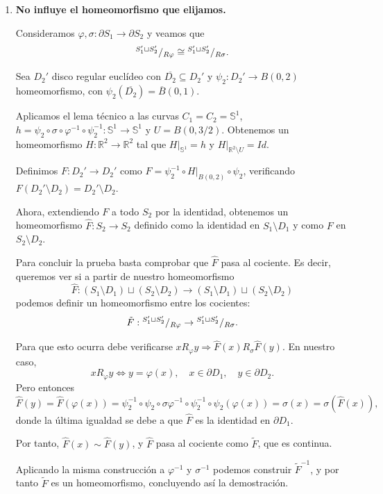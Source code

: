 {\begin{enumerate}
        Pero como $F$ es un homeomorfismo, $S_1 \setminus F(D_4) \cong S_1 \setminus D_4$, concluyendo así el paso 2.

        \item \textbf{No influye el homeomorfismo que elijamos.}

        Consideramos $\varphi,\sigma:\partial S_1\to\partial S_2$ y veamos que
        \[
        {^{S_1'\sqcup S_2'}}/{_{R\varphi}}\cong{^{S_1'\sqcup S_2'}}/{_{R\sigma}}.
        \]

        Sea $D_2'$ disco regular euclídeo con $\overline{D_2}\subseteq D_2'$ y $\psi_2 : D_2' \to B(0,2)$ homeomorfismo, con $\psi_2(\overline{D_2}) = \overline{B}(0,1)$. 

        Aplicamos el lema técnico a las curvas $C_1 = C_2 = \mathbb{S}^1$, $h = \psi_2 \circ \sigma \circ \varphi^{-1} \circ \psi_2^{-1} : \mathbb{S}^1\to \mathbb{S}^1$ y $U = B(0,3/2)$. Obtenemos un homeomorfismo $H : \mathbb{R}^2 \to \mathbb{R}^2$ tal que $H\vert_{\mathbb{S}^1} = h$ y $H\vert_{\mathbb{R}^2\setminus U} = Id$. 

        Definimos $F:D_2' \to D_2'$ como $F = \psi_2^{-1} \circ H \vert_{B(0,2)} \circ \psi_2$, verificando $F(D_2'\setminus D_2) = D_2'\setminus D_2$. 

        Ahora, extendiendo $F$ a todo $S_2$ por la identidad, obtenemos un homeomorfismo $\hat{F} : S_2 \to S_2$ definido como la identidad en $S_1 \setminus D_1$ y como $F$ en $ S_2 \setminus D_2$.

        Para concluir la prueba basta comprobar que $\hat{F}$ pasa al cociente. Es decir, queremos ver si a partir de nuestro homeomorfismo 
        \[
        \hat{F} : (S_1\setminus D_1)\sqcup(S_2\setminus D_2) \to (S_1\setminus D_1)\sqcup(S_2\setminus D_2)
        \]
        podemos definir un homeomorfismo entre los cocientes:  
        \[
        \tilde{F} : {^{S_1'\sqcup S_2'}}/{_{R\varphi}} \to {^{S_1'\sqcup S_2'}}/{_{R\sigma}}.
        \]

        Para que esto ocurra debe verificarse $xR_\varphi y \Rightarrow \hat{F}(x) R_\sigma \hat{F}(y)$. En nuestro caso,  
        \[
        xR_\varphi y \iff y = \varphi(x), \quad x\in \partial D_1, \quad y\in \partial D_2. 
        \]
        Pero entonces
        \[
        \hat{F}(y) = \hat{F}(\varphi(x)) = \psi_2^{-1} \circ \psi_2 \circ \sigma \varphi^{-1} \circ \psi_2^{-1} \circ \psi_2(\varphi(x))
        = \sigma(x) = \sigma(\hat{F}(x)),
        \]
        donde la última igualdad se debe a que $\hat{F}$ es la identidad en $\partial D_1$. 

        Por tanto, $\hat{F}(x) \sim \hat{F}(y)$, y $\hat{F}$ pasa al cociente como $\tilde{F}$, que es continua. 

        Aplicando la misma construcción a $\varphi^{-1}$ y $\sigma^{-1}$ podemos construir $\tilde{F}^{-1}$, y por tanto $\tilde{F}$ es un homeomorfismo, concluyendo así la demostración.
    \end{enumerate}
}


